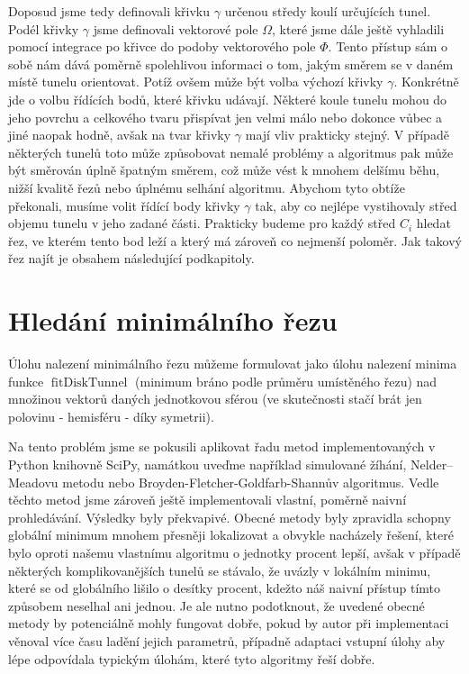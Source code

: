 Doposud jsme tedy definovali křivku $ \gamma $ určenou středy koulí určujících
tunel. Podél křivky $ \gamma $ jsme definovali vektorové pole $ \Omega $, které
jsme dále ještě vyhladili pomocí integrace po křivce do podoby vektorového
pole $ \Phi $. Tento přístup sám o sobě nám dává poměrně spolehlivou informaci
o tom, jakým směrem se v daném místě tunelu orientovat. Potíž ovšem
může být volba výchozí křivky $ \gamma $. Konkrétně jde o volbu řídících bodů,
které křivku udávají. Některé koule tunelu mohou do jeho povrchu a celkového
tvaru přispívat jen velmi málo nebo dokonce vůbec a jiné naopak hodně, avšak na tvar
křivky $ \gamma $ mají vliv prakticky stejný. V případě některých tunelů
toto může způsobovat nemalé problémy a algoritmus pak může být směrován úplně
špatným směrem, což může vést k mnohem delšímu běhu, nižší kvalitě řezů nebo
úplnému selhání algoritmu. Abychom tyto obtíže překonali, musíme volit
řídící body křivky $ \gamma $ tak, aby co nejlépe vystihovaly střed objemu
tunelu v jeho zadané části. Prakticky budeme pro každý střed $ C_i $ hledat řez,
ve kterém tento bod leží a který má zároveň co nejmenší poloměr. Jak takový
řez najít je obsahem následující podkapitoly.






\section{Hledání minimálního řezu} \label{subsec:min_cut}
Úlohu nalezení minimálního řezu můžeme formulovat jako úlohu nalezení minima
funkce $ \operatorname{fitDiskTunnel} $ (minimum bráno podle průměru umístěného řezu)
nad množinou vektorů daných jednotkovou sférou (ve skutečnosti stačí brát
jen polovinu - hemisféru - díky symetrii).

Na tento problém jsme se pokusili aplikovat řadu metod implementovaných v Python
knihovně SciPy, namátkou uveďme například simulované žíhání, Nelder–Meadovu metodu
nebo Broyden-Fletcher-Goldfarb-Shannův algoritmus. Vedle těchto metod jsme zároveň
ještě implementovali vlastní, poměrně naivní prohledávání. Výsledky byly
překvapivé. Obecné metody byly zpravidla schopny globální minimum mnohem přesněji
lokalizovat a obvykle nacházely řešení, které bylo oproti našemu vlastnímu
algoritmu o jednotky procent lepší, avšak v případě některých komplikovanějších
tunelů se stávalo, že uvázly v lokálním minimu, které se od globálního lišilo
o desítky procent, kdežto náš naivní přístup tímto způsobem neselhal ani jednou.
Je ale nutno podotknout, že uvedené obecné metody by potenciálně mohly fungovat
dobře, pokud by autor při implementaci věnoval více času ladění jejich parametrů,
případně adaptaci vstupní úlohy aby lépe odpovídala typickým úlohám, které tyto
algoritmy řeší dobře.

